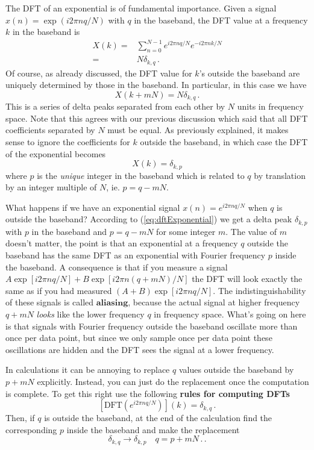 The DFT of an exponential is of fundamental importance.
Given a signal $x(n)=\exp(i2\pi nq/N)$ with $q$ in the baseband, the DFT value at a frequency $k$ in the baseband is
\begin{align}
  X(k) =& \sum_{n=0}^{N-1} e^{i2\pi nq/N}e^{-i2\pi nk/N} \\
  =& N \delta_{k, q} \, .
\end{align}
Of course, as already discussed, the DFT value for $k$'s outside the baseband are uniquely determined by those in the baseband.
In particular, in this case we have
\begin{equation}
  X(k + mN) = N \delta_{k, q} \, .
\end{equation}
This is a series of delta peaks separated from each other by $N$ units in frequency space.
Note that this agrees with our previous discussion which said that all DFT coefficients separated by $N$ must be equal.
As previously explained, it makes sense to ignore the coefficients for $k$ outside the baseband, in which case the DFT of the exponential becomes
\begin{equation}
X(k) = \delta_{k,p} \label{eq:dftExponential}
\end{equation}
where $p$ is the \emph{unique} integer in the baseband which is related to $q$ by translation by an integer multiple of $N$, ie. $p=q-mN$.


What happens if we have an exponential signal $x(n)=e^{i2\pi nq/N}$ when $q$ is outside the baseband?
According to (\ref{eq:dftExponential}) we get a delta peak $\delta_{k,p}$ with $p$ in the baseband and $p = q-mN$ for some integer $m$.
The value of $m$ doesn't matter, the point is that an exponential at a frequency $q$ outside the baseband has the same DFT as an exponential with Fourier frequency $p$ inside the baseband.
A consequence is that if you measure a signal $A\exp\left[i2\pi nq/N\right]+B\exp\left[i2\pi n(q+mN)/N\right]$ the DFT will look exactly the same as if you had measured $(A+B)\exp\left[i2\pi nq/N\right]$.
The indistinguishability of these signals is called $\textbf{aliasing}$, because the actual signal at higher frequency $q+mN$ \emph{looks} like the lower frequency $q$ in frequency space.
What's going on here is that signals with Fourier frequency outside the baseband oscillate more than once per data point, but since we only sample once per data point these oscillations are hidden and the DFT sees the signal at a lower frequency.

In calculations it can be annoying to replace $q$ values outside the baseband by $p+mN$ explicitly.
Instead, you can just do the replacement once the computation is complete.
To get this right use the following \textbf{rules for computing DFTs}
\begin{equation}
  \left[ \textrm{DFT}\left( e^{i2\pi nq/N} \right)\right](k) = \delta_{k,q} \, .
\end{equation}
Then, if $q$ is outside the baseband, at the end of the calculation find the corresponding $p$ inside the baseband and make the replacement
\begin{equation}
  \delta_{k,q} \rightarrow \delta_{k,p} \quad q=p+mN \, . \label{eq:aliasReplacement}
  \, .
\end{equation}
